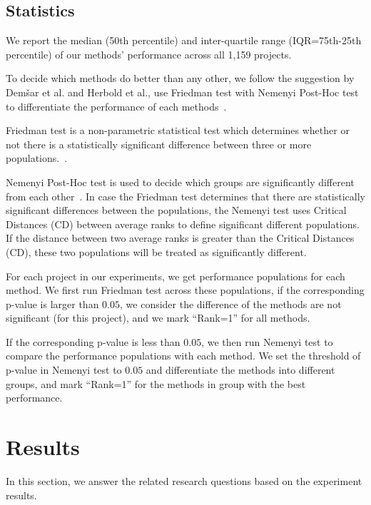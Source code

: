 \documentclass[smallextended]{svjour3}
\newcommand{\respto}[1]{
\fcolorbox{black}{black!15}{%
\label{resp:#1}%
\bf\scriptsize R{#1}}}
\newcommand{\BLUE}{\color{blue}}
\newcommand{\BLACK}{\color{black}}
\begin{document}
\subsection{Statistics}
\label{sect:stats} 
We report the median (50th percentile) and inter-quartile range (IQR=75th-25th percentile) of our methods' performance across all 1,159 projects.  

\BLUE
\respto{2C} \respto{4E2}
To decide which methods do better than any other, we follow the suggestion by Dem{\v{s}}ar et al. and Herbold et al., use Friedman test with Nemenyi Post-Hoc test to differentiate the performance of each methods~\cite{demvsar2006statistical,herbold2017comments,herbold2018correction}.

Friedman test is a non-parametric statistical test which determines whether or not there is a statistically significant difference between three or more populations.~\cite{friedman1940comparison}.

Nemenyi Post-Hoc test is used to decide which groups are significantly different from each other~\cite{nemenyi1963distribution}. In case the Friedman test determines that there are
statistically significant differences between the populations, the Nemenyi test
uses Critical Distances (CD) between average ranks to define significant different populations. If the distance between two average ranks is greater than the Critical Distances (CD), these two populations will be treated as significantly different.

For each project in our experiments, we get performance populations for each method. We first run Friedman test across these populations, if the corresponding p-value is larger than $\mathit{0.05}$, we consider the difference of the methods are not significant (for this project), and we mark ``Rank=1'' for all methods.

If the corresponding p-value is less than $\mathit{0.05}$, we then run Nemenyi test to compare the performance populations with each method. We set the threshold of p-value in Nemenyi test to $\mathit{0.05}$ and differentiate the methods into different groups, and mark ``Rank=1'' for the methods in group with the best performance. 

\BLACK


\section{Results}
\label{sect:resul} 
In this section, we answer the related research questions based on the experiment results.
\BLACK
\end{document}
